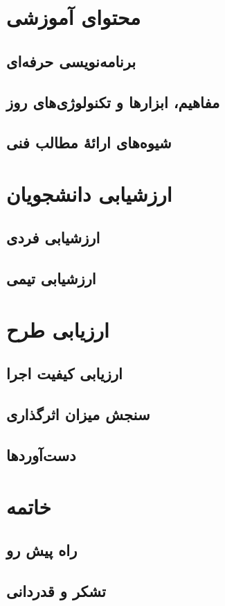 \documentclass[a4paper,notitlepage]{report}
\begin{document}
\chapter{محتوای آموزشی}
\section{برنامه‌نویسی حرفه‌ای}
\section{مفاهیم، ابزارها و تکنولوژی‌های روز}
\section{شیوه‌های ارائهٔ مطالب فنی}
\chapter{ارزشیابی دانشجویان}
\section{ارزشیابی فردی}
\section{ارزشیابی تیمی}
\chapter{ارزیابی طرح}
\section{ارزیابی کیفیت اجرا} 
\section{سنجش میزان اثرگذاری}
\section{دست‌آوردها}
\chapter{خاتمه}
\section{راه پیش رو}
\section{تشکر و قدردانی}
\end{document}
